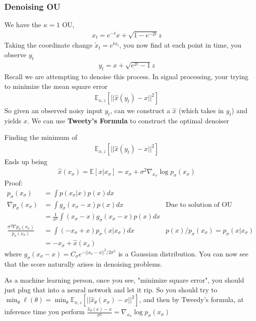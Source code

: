 \subsubsection{Denoising OU}
We have the $\kappa=1$ OU, 
\begin{align}
	x_t = e^{-t} x + \sqrt{1 - e^{-2 t}} z
\end{align}
Taking the coordinate change $\tilde x_t = e^{t x_t}$, you now find at each point in time, you observe $y_t$
\begin{align}
	y_t = x + \sqrt{e^{2t} - 1}z
\end{align}
Recall we are attempting to denoise this process. In signal processing, your trying to minimize the mean square error 
\begin{align}
	\mathbb E_{x,z} [||\hat x(y_t) - x||^2]
\end{align}
So given an observed noisy input $y_t$, can we construct a $\hat x$ (which takes in $y_t$) and yields $x$. We can use \textbf{Tweety's Formula} to construct the optimal denoiser
\begin{theorem}
	Finding the minimum of 
	\begin{align}
		\mathbb E_{x,z} [||\hat x(y_t) - x||^2]
	\end{align}
	Ends up being 
	\begin{align}
		\hat x (x_\sigma) = \mathbb E[x | x_\sigma] =  x_\sigma + \sigma^2 \nabla_{x_\sigma} \log p_\sigma (x_\sigma)
	\end{align}
	Proof:
	\begin{align}
		p_\sigma (x_\sigma) & = \int p(x_\sigma | x) p(x) dx\\
		\nabla p_\sigma (x_\sigma) & = \int g_\sigma (x_\sigma - x) p(x) dx & \text{Due to solution of OU}\\
		& = \frac{1}{\sigma^2} \int  (x_\sigma - x) g_\sigma(x_\sigma - x) p(x) dx\\
		\frac{\sigma^2 \nabla p_\sigma(x_\sigma)}{p_\sigma(x_\sigma)} &  = \int (-x_\sigma + x) p_\sigma(x | x_\sigma) dx & p(x) / p_\sigma(x_\sigma) = p_\sigma(x | x_\sigma)\\
		& = - x_\sigma + \hat x(x_\sigma) 
	\end{align}
	where $g_\sigma(x_\sigma -x ) = C_\sigma e^{-||x_\sigma - x||^2 / 2\sigma^2}$ is a Gaussian distribution. You can now see that the score naturally arises in denoising problems.
\end{theorem}
As a machine learning person, once you see, "minimize square error", you should just plug that into a neural network and let it rip. So you should try to $\min_\theta \ell(\theta) = \min_\theta \mathbb E_{x,z}[|| \hat x_\theta (x_\sigma) - x||^2]$, and then by Tweedy's formula, at inference time you perform $\frac{\hat x_\theta(x) - x}{\sigma^2} = \nabla_{x_\sigma} \log p_\sigma (x_\sigma)$


